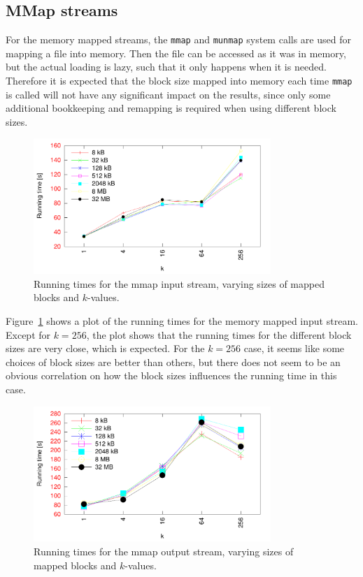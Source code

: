 \documentclass[a4paper,12pt]{article}
\begin{document}
\subsection{MMap streams}
For the memory mapped streams, the \texttt{mmap} and \texttt{munmap}
system calls are used for mapping a file into memory. Then the file
can be accessed as it was in memory, but the actual loading
is lazy, such that it only happens when it is needed.
Therefore it is expected that the block size mapped into memory each
time \texttt{mmap} is called will not have any significant impact on
the results, since only some additional bookkeeping and remapping is required when using different block sizes.

\begin{figure}[h!]
  \centering
  \includegraphics[width=0.8\textwidth]{mmap_input}
  \caption{Running times for the mmap input stream, varying sizes of
    mapped blocks and $k$-values.}
  \label{fig:mmap-input}
\end{figure}

Figure~\ref{fig:mmap-input} shows a plot of the running times for the
memory mapped input stream. Except for $k = 256$, the plot shows
that the running times for the different block sizes are very close,
which is expected. For the $k = 256$ case, it seems like some choices
of block sizes are better than others, but there does not seem to be an
obvious correlation on how the block sizes influences the running time
in this case.

\begin{figure}[h!]
  \centering
  \includegraphics[width=0.8\textwidth]{mmap_output}
  \caption{Running times for the mmap output stream, varying sizes of
    mapped blocks and $k$-values.}
  \label{fig:mmap-output}
\end{figure}
\end{document}
